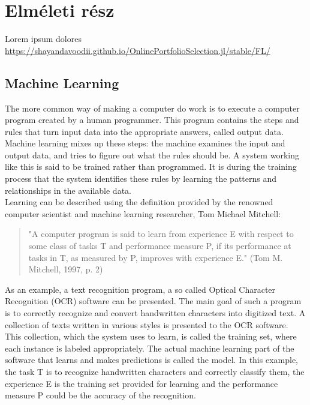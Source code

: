 \documentclass[a4paper,oneside,onecolumn,12pt]{LegrandOrangeBook}
\begin{document}
\chapter{Elméleti rész}
Lorem ipsum dolores\\
\url{https://shayandavoodii.github.io/OnlinePortfolioSelection.jl/stable/FL/}\\

	\section{Machine Learning}
	The more common way of making a computer do work is to execute a computer program created by a human programmer. This program contains the steps and rules that turn input data into the appropriate answers, called output data. Machine learning mixes up these steps: the machine examines the input and output data, and tries to figure out what the rules should be. A system working like this is said to be trained rather than programmed. It is during the training process that the system identifies these rules by learning the patterns and relationships in the available data. \cite{DLP}\\
	Learning can be described using the definition provided by the renowned computer scientist and machine learning researcher, Tom Michael Mitchell:
	\begin{quote}
		"A computer program is said to learn from experience E with respect to some class of tasks T and performance measure P, if its performance at tasks in T, as measured by P, improves with experience E." (Tom M. Mitchell, 1997, p. 2)\cite{ML}
	\end{quote}
	As an example, a text recognition program, a so called Optical Character Recognition (OCR) software can be presented. The main goal of such a program is to correctly recognize and convert handwritten characters into digitized text. A collection of texts written in various styles is presented to the OCR software. This collection, which the system uses to learn, is called the training set, where each instance is labeled appropriately. The actual machine learning part of the software that learns and makes predictions is called the model. In this example, the task T is to recognize handwritten characters and correctly classify them, the experience E is the training set provided for learning and the performance measure P could be the accuracy of the recognition.\\
\end{document}
